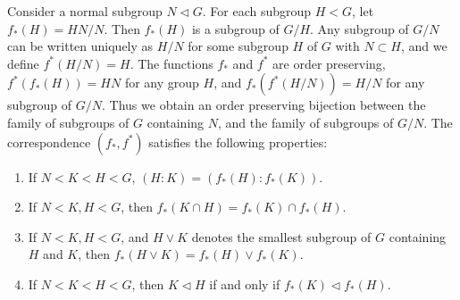 \begin{theorem}
    Consider a normal subgroup $N \lhd G$. For each subgroup $H < G$, let $f_*(H) = HN/N$. Then $f_*(H)$ is a subgroup of $G/H$. Any subgroup of $G/N$ can be written uniquely as $H/N$ for some subgroup $H$ of $G$ with $N \subset H$, and we define $f^*(H/N) = H$. The functions $f_*$ and $f^*$ are order preserving, $f^*(f_*(H)) = HN$ for any group $H$, and $f_*(f^*(H/N)) = H/N$ for any subgroup of $G/N$. Thus we obtain an order preserving bijection between the family of subgroups of $G$ containing $N$, and the family of subgroups of $G/N$. The correspondence $(f_*,f^*)$ satisfies the following properties:
    \begin{enumerate}
        \item If $N < K < H < G$, $(H:K) = (f_*(H):f_*(K))$.
        \item If $N < K,H < G$, then $f_*(K \cap H) = f_*(K) \cap f_*(H)$.
        \item If $N < K,H < G$, and $H \vee K$ denotes the smallest subgroup of $G$ containing $H$ and $K$, then $f_*(H \vee K) = f_*(H) \vee f_*(K)$.
        \item If $N < K < H < G$, then $K \lhd H$ if and only if $f_*(K) \lhd f_*(H)$.
    \end{enumerate}
\end{theorem}
